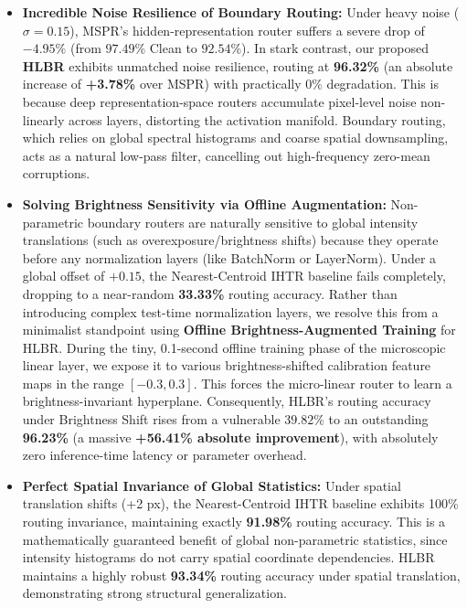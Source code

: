 \documentclass{article}
\theoremstyle{plain}
\theoremstyle{definition}
\theoremstyle{remark}
\begin{document}
\begin{itemize}
    \item \textbf{Incredible Noise Resilience of Boundary Routing:} Under heavy noise ($\sigma=0.15$), MSPR's hidden-representation router suffers a severe drop of \textbf{$-4.95\%$} (from $97.49\%$ Clean to $92.54\%$). In stark contrast, our proposed \textbf{HLBR} exhibits unmatched noise resilience, routing at \textbf{96.32\%} (an absolute increase of \textbf{+3.78\%} over MSPR) with practically $0\%$ degradation. This is because deep representation-space routers accumulate pixel-level noise non-linearly across layers, distorting the activation manifold. Boundary routing, which relies on global spectral histograms and coarse spatial downsampling, acts as a natural low-pass filter, cancelling out high-frequency zero-mean corruptions.
    \item \textbf{Solving Brightness Sensitivity via Offline Augmentation:} Non-parametric boundary routers are naturally sensitive to global intensity translations (such as overexposure/brightness shifts) because they operate before any normalization layers (like BatchNorm or LayerNorm). Under a global offset of $+0.15$, the Nearest-Centroid IHTR baseline fails completely, dropping to a near-random \textbf{33.33\%} routing accuracy. Rather than introducing complex test-time normalization layers, we resolve this from a minimalist standpoint using \textbf{Offline Brightness-Augmented Training} for HLBR. During the tiny, 0.1-second offline training phase of the microscopic linear layer, we expose it to various brightness-shifted calibration feature maps in the range $[-0.3, 0.3]$. This forces the micro-linear router to learn a brightness-invariant hyperplane. Consequently, HLBR's routing accuracy under Brightness Shift rises from a vulnerable $39.82\%$ to an outstanding \textbf{96.23\%} (a massive \textbf{+56.41\% absolute improvement}), with absolutely zero inference-time latency or parameter overhead.
    \item \textbf{Perfect Spatial Invariance of Global Statistics:} Under spatial translation shifts (+2 px), the Nearest-Centroid IHTR baseline exhibits 100\% routing invariance, maintaining exactly \textbf{91.98\%} routing accuracy. This is a mathematically guaranteed benefit of global non-parametric statistics, since intensity histograms do not carry spatial coordinate dependencies. HLBR maintains a highly robust \textbf{93.34\%} routing accuracy under spatial translation, demonstrating strong structural generalization.
\end{itemize}
\end{document}
